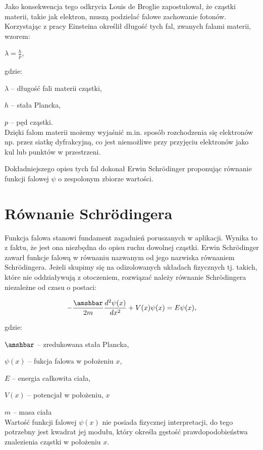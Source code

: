 \documentclass{SGGW-thesis}
\begin{document}
	 Jako konsekwencja tego odkrycia Louis de Broglie zapostulował, że cząstki materii, takie jak elektron, muszą podzielać falowe zachowanie fotonów. Korzystając z pracy Einsteina określił długość tych fal\cite{matter-wave}, zwanych falami materii, wzorem:
	 
	 \begin{center}
	 $\lambda=\frac{h}{p}$,
	 \end{center}
	 
	 gdzie:
	 
	 $\lambda$ -- długość fali materii cząstki,
	 
	 $h$ -- stała Plancka,
	 
	 $p$ -- pęd cząstki.\\
	 
	 Dzięki falom materii możemy wyjaśnić m.in. sposób rozchodzenia się elektronów np. przez siatkę dyfrakcyjną, co jest niemożliwe przy przyjęciu elektronów jako kul lub punktów w przestrzeni.
	 
	 Dokładniejszego opisu tych fal dokonał Erwin Schrödinger proponując równanie funkcji falowej $\psi$ o zespolonym zbiorze wartości. 
	 
	\section{Równanie Schrödingera}
	Funkcja falowa stanowi fundament zagadnień poruszanych w aplikacji. Wynika to z faktu, że jest ona niezbędna do opisu ruchu dowolnej cząstki. Erwin Schrödinger zawarł funkcje falową w równaniu nazwanym od jego nazwiska równaniem Schrödingera.  Jeżeli skupimy się na odizolowanych układach fizycznych tj. takich, które nie oddziaływują z otoczeniem, rozwiązać należy równanie Schrödingera niezależne od czasu o postaci:
	\begin{center}
	\begin{equation}
		-\frac{\amshbar}{2m} \frac{d^2\psi(x)}{dx^2} + V(x)\psi(x) = E\psi(x),
	\end{equation}
	\end{center}
	gdzie:
	
	$\amshbar$ -- zredukowana stała Plancka,
	
	$\psi(x)$ -- fukcja falowa w położeniu $x$,
	
	$E$ -- energia całkowita ciała,
	
	$V(x)$ -- potencjał w położeniu, $x$
	
	$m$ -- masa ciała\\
	
	Wartość funkcji falowej $\psi(x)$ nie posiada fizycznej interpretacji, do tego potrzebny jest kwadrat jej modułu, który określa gęstość prawdopodobieństwa znalezienia cząstki w położeniu $x$. 
\end{document}
